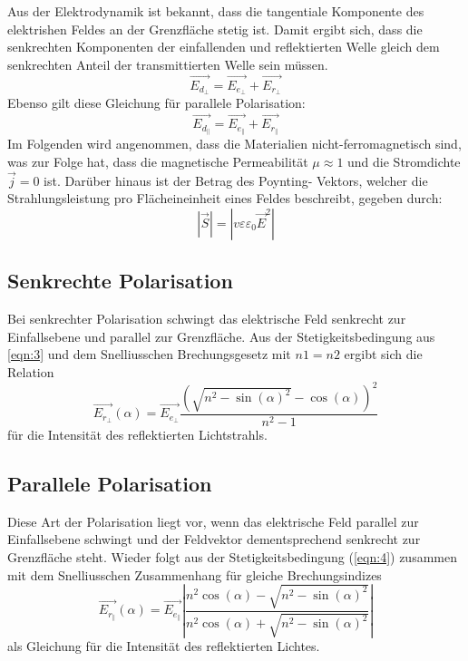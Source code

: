 Aus der Elektrodynamik ist bekannt, dass die tangentiale Komponente des elektrishen 
Feldes an der Grenzfläche stetig ist. Damit ergibt sich, dass die senkrechten 
Komponenten der einfallenden und reflektierten Welle gleich dem senkrechten 
Anteil der transmittierten Welle sein müssen.
\begin{equation}
    \label{eqn:3}
    \vec{E_{d_\perp}} = \vec{E_{e_\perp}} + \vec{E_{r_\perp}}
\end{equation}
Ebenso gilt diese Gleichung für parallele Polarisation:
\begin{equation}
    \label{eqn:4}
    \vec{E_{d_\parallel}} = \vec{E_{e_\parallel}} + \vec{E_{r_\parallel}}
\end{equation}
Im Folgenden wird angenommen, dass die Materialien nicht-ferromagnetisch
sind, was zur Folge hat, dass die magnetische Permeabilität $\mu \approx 1$ und 
die Stromdichte $\vec{j}=0$ ist. Darüber hinaus ist der Betrag des Poynting-
Vektors, welcher die Strahlungsleistung pro Flächeineinheit eines Feldes beschreibt, 
gegeben durch:
\begin{equation}
    \label{eqn:5}
    |\vec{S}| = |v \varepsilon \varepsilon_0 \vec{E}^2|
\end{equation}

\subsection{Senkrechte Polarisation}
\label{subsec:senk}
Bei senkrechter Polarisation schwingt das elektrische Feld senkrecht zur 
Einfallsebene und parallel zur Grenzfläche.
Aus der Stetigkeitsbedingung aus \autoref{eqn:3} und dem Snelliusschen Brechungsgesetz 
mit $n1=n2$ ergibt sich die Relation 
\begin{equation}
    \label{eqn:6}
    \vec{E_{r_\perp}}(\alpha) = \vec{E_{e_\perp}} \frac{(\sqrt{n^2-\sin(\alpha)^2} - 
    \cos(\alpha))^2}{n^2 - 1}
\end{equation}
für die Intensität des reflektierten Lichtstrahls.

\subsection{Parallele Polarisation}
\label{subsec:para}
Diese Art der Polarisation liegt vor, wenn das elektrische Feld parallel zur 
Einfallsebene schwingt und der Feldvektor dementsprechend senkrecht zur Grenzfläche 
steht. Wieder folgt aus der Stetigkeitsbedingung (\autoref{eqn:4}) zusammen mit 
dem Snelliusschen Zusammenhang für gleiche Brechungsindizes
\begin{equation}
    \vec{E_{r_\parallel}}(\alpha) = \vec{E_{e_\parallel}} 
    \left|\frac{n^2 \cos(\alpha) - \sqrt{n^2-\sin(\alpha)^2}}
    {n^2 \cos(\alpha) + \sqrt{n^2-\sin(\alpha)^2}}  \right|
\end{equation}
als Gleichung für die Intensität des reflektierten Lichtes.

